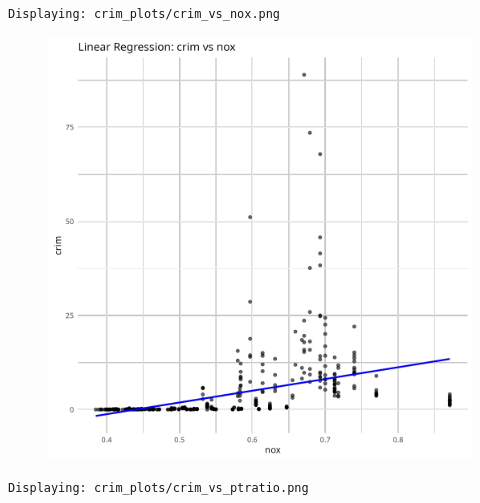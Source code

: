 \documentclass[
]{article}
\begin{document}
\begin{verbatim}
Displaying: crim_plots/crim_vs_nox.png 
\end{verbatim}

\begin{figure}[H]

{\centering \includegraphics{hw1_files/figure-pdf/unnamed-chunk-16-7.pdf}

}

\end{figure}

\begin{verbatim}
Displaying: crim_plots/crim_vs_ptratio.png 
\end{verbatim}
\end{document}
